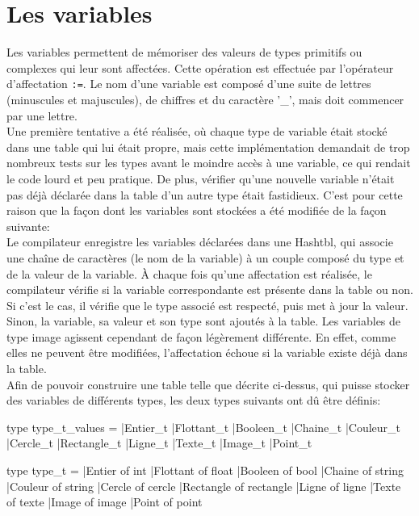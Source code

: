 \documentclass[a4paper, 12pt]{report}
\begin{document}
	\section{Les variables}
	
	Les variables permettent de mémoriser des valeurs de types primitifs ou complexes qui leur sont affectées. Cette opération est effectuée par l'opérateur d'affectation \texttt{:=}. Le nom d'une variable est composé d'une suite de lettres (minuscules et majuscules), de chiffres et du caractère '\_', mais doit commencer par une lettre.\\
	
	Une première tentative a été réalisée, où chaque type de variable était stocké dans une table qui lui était propre, mais cette implémentation demandait de trop nombreux tests sur les types avant le moindre accès à une variable, ce qui rendait le code lourd et peu pratique. De plus, vérifier qu'une nouvelle variable n'était pas déjà déclarée dans la table d'un autre type était fastidieux. C'est pour cette raison que la façon dont les variables sont stockées a été modifiée de la façon suivante:\\
	
	Le compilateur enregistre les variables déclarées dans une Hashtbl, qui associe une cha\^ine de caractères (le nom de la variable) à un couple composé du type et de la valeur de la variable. \`A chaque fois qu'une affectation est réalisée, le compilateur vérifie si la variable correspondante est présente dans la table ou non. Si c'est le cas, il vérifie que le type associé est respecté, puis met à jour la valeur. Sinon, la variable, sa valeur et son type sont ajoutés à la table. Les variables de type image agissent cependant de façon légèrement différente. En effet, comme elles ne peuvent être modifiées, l'affectation échoue si la variable existe déjà dans la table.\\
	
	Afin de pouvoir construire une table telle que décrite ci-dessus, qui puisse stocker des variables de différents types, les deux types suivants ont dû être définis:

\begin{multicols}{2}
\begin{verbatimtab}[4]
	type type_t_values =
		|Entier_t
		|Flottant_t
		|Booleen_t
		|Chaine_t
		|Couleur_t
		|Cercle_t
		|Rectangle_t
		|Ligne_t
		|Texte_t
		|Image_t
		|Point_t
		
	type type_t =
		|Entier of int
		|Flottant of float
		|Booleen of bool
		|Chaine of string
		|Couleur of string
		|Cercle of cercle
		|Rectangle of rectangle
		|Ligne of ligne
		|Texte of texte
		|Image of image
		|Point of point
\end{verbatimtab}
\end{multicols}
	
\end{document}
